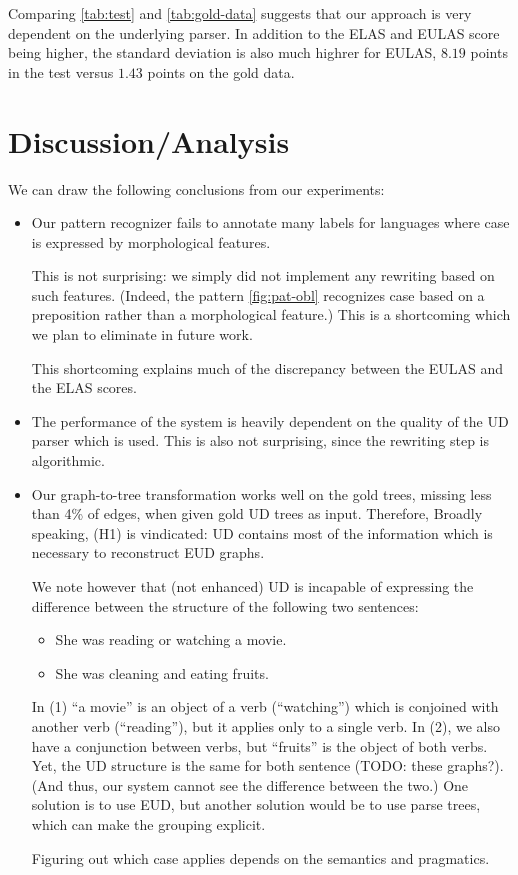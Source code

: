 \documentclass[11pt,a4paper]{article}
\begin{document}
Comparing \cref{tab:test} and \cref{tab:gold-data} suggests
that our approach is very dependent on the underlying parser. In
addition to the ELAS and EULAS score being higher, the standard
deviation is also much highrer for EULAS, $8.19$ points in the test
versus $1.43$ points on the gold data.

\section{Discussion/Analysis}

We can draw the following conclusions from our experiments:

\begin{itemize}
\item
  Our pattern recognizer fails to annotate many labels
  for languages where case is expressed by morphological features.
  
  This is not surprising: we simply did not implement any rewriting
  based on such features. (Indeed, the pattern \cref{fig:pat-obl}
  recognizes case based on a preposition rather than a morphological
  feature.) This is a shortcoming which we plan to eliminate in future
  work.

  This shortcoming explains much of the discrepancy between the EULAS
  and the ELAS scores.
\item The performance of the system is heavily dependent on the
  quality of the UD parser which is used. This is also not surprising,
  since the rewriting step is algorithmic.

\item Our graph-to-tree transformation works well on the gold trees,
  missing less than 4\% of edges, when given gold UD trees as input.
  Therefore, Broadly speaking, (H1) is vindicated: UD contains most of
  the information which is necessary to reconstruct EUD graphs.

  We note however that (not enhanced) UD is incapable of expressing
  the difference between the structure of the following two sentences:
  
  \begin{itemize}
  \item She was reading or watching a movie.
  \item She was cleaning and eating fruits.
  \end{itemize}
  In (1) ``a movie'' is an object of a verb (``watching'') which is
  conjoined with another verb (``reading''), but it applies only to a
  single verb. In (2), we also have a conjunction between verbs, but
  ``fruits'' is the object of both verbs. Yet, the UD structure is the
  same for both sentence (TODO: these graphs?).  (And thus, our system
  cannot see the difference between the two.)  One solution is to use
  EUD, but another solution would be to use parse trees, which can
  make the grouping explicit.

  Figuring out which case applies depends on the semantics and
  pragmatics.

\end{itemize}
\end{document}
